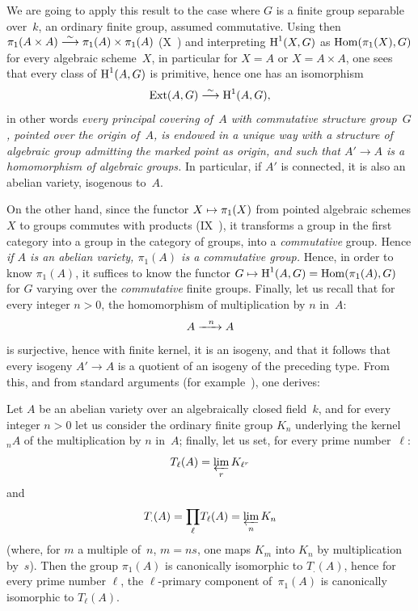 We are going to apply this result to the case where $G$ is a finite
group separable over~$k$, \ie an ordinary finite group, assumed
commutative. Using then $\pi_1(A\times A)\overset{\sim}{\longrightarrow}\allowbreak \pi_1(A)\times
\pi_1(A)$ (X~) and interpreting $\operatorname{H}^1(X,G)$ as
$\operatorname{Hom}(\pi_1(X),G)$ for every algebraic scheme~$X$, in
particular for $X=A$ or $X=A\times A$, one sees that every class of
$\operatorname{H}^1(A,G)$ is primitive, hence one has an isomorphism
$$
\operatorname{Ext}(A,G)\overset{\sim}{\longrightarrow} \operatorname{H}^1(A,G),
$$
in other words \emph{every principal covering of~$A$ with
commutative structure group~$G$, pointed over the origin
of~$A$, is endowed in a unique way with a structure of
algebraic group admitting the marked point as origin, and such that
$A'\to A$ is a homomorphism of algebraic groups.} In
particular, if $A'$ is connected, it is also an
abelian variety, isogenous to~$A$.

On the other hand, since the functor $X\mto \pi_1(X)$ from pointed
algebraic schemes $X$ to groups commutes with products
(IX~), it transforms a group in the first
category into a group in the category of groups, \ie into
a \emph{commutative} group. Hence \emph{if $A$ is an abelian
variety, $\pi_1(A)$
is a commutative group.} Hence, in order to know $\pi_1(A)$, it
suffices to know the functor $G\mto
\H^1(A,G)=\Hom(\pi_1(A),G)$ for $G$ varying over the
\emph{commutative} finite groups. Finally, let us recall that for every integer $n>0$,
the homomorphism of multiplication by $n$ in~$A$:
$$
A\lto{n} A
$$
is surjective, hence with finite kernel, \ie it is an isogeny, and
that it follows that every isogeny $A'\to A$ is a quotient
of an isogeny of the preceding type. From this, and from
standard arguments (\cf for example~\cite{XI.6}), one derives:

\begin{theorem}
\label{XI.2.1}
Let $A$ be an abelian variety over an
algebraically closed field~$k$, and for every integer $n>0$ let us consider
the ordinary finite group $K_n$ underlying the kernel ${}_nA$ of the
multiplication by $n$ in~$A$; finally, let us set, for every prime
number~$\ell$:
$$
T_\ell(A)=\varprojlim_r K_{\ell^r}
$$
and
$$
T_{.}(A)=\underset{\ell}{\prod}T_\ell(A)=\varprojlim_n K_n
$$
(where, for $m$ a multiple of~$n$, $m=ns$, one maps $K_m$ into $K_n$
by multiplication by~$s$). Then the group $\pi_1(A)$ is
canonically isomorphic to $T_{.}(A)$, hence for every prime
number $\ell$, the $\ell$-primary component of~$\pi_1(A)$ is
canonically isomorphic to $T_\ell(A)$.
\end{theorem}

